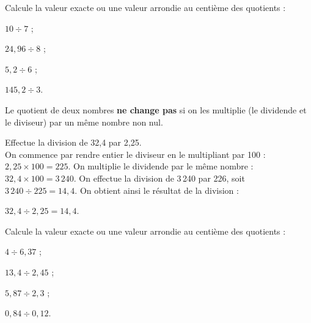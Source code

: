 \begin{methode*1}
\begin{exemple*1}
\end{exemple*1}

\exercice

Calcule la valeur exacte ou une valeur arrondie au centième des quotients :
\begin{colenumerate}{4}
 \item $10 \div 7$ ;
 \item $24,96 \div 8$ ;
 \item $5,2 \div 6$ ;
 \item $145,2 \div 3$.
 \end{colenumerate}

\end{methode*1}


\begin{aconnaitre}
Le quotient de deux nombres \textbf{ne change pas} si on les multiplie (le dividende et le diviseur) par un même nombre non nul.
\end{aconnaitre}


\begin{methode*1}

\begin{exemple*1}
Effectue la division de 32,4 par 2,25.\\[1em]
On commence par rendre entier le diviseur en le multipliant par 100 : $2,25 \times 100 = 225$. On multiplie le dividende par le même nombre : $32,4 \times 100 = 3\,240$. On effectue la division de 3\,240  par 226, soit $3\,240 \div 225 = 14,4$. On obtient ainsi le résultat de la division :

$32,4 \div 2,25 = 14,4$. 
\end{exemple*1}

\exercice

Calcule la valeur exacte ou une valeur arrondie au centième des quotients :
\begin{colenumerate}{4}
 \item $4 \div 6,37$ ;
 \item $13,4 \div 2,45$ ;
 \item $5,87 \div 2,3$ ;
 \item $0,84 \div 0,12$.
 \end{colenumerate}

\end{methode*1}


